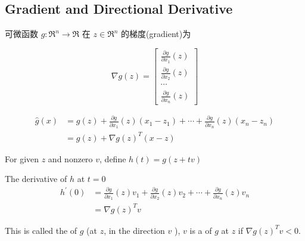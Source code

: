 \subsection{Gradient and Directional Derivative}

\begin{definition}
    可微函数 $ g: \mathfrak{R}^{n} \rightarrow \mathfrak{R} $ 在 $ z \in \mathfrak{R}^{n} $ 的梯度(gradient)为

\begin{equation}
\nabla g(z)=\left[\begin{array}{c}
\frac{\partial g}{\partial x_{1}}(z) \\
\frac{\partial g}{\partial x_{2}}(z) \\
\cdots \\
\frac{\partial g}{\partial x_{n}}(z)
\end{array}\right]
\end{equation}
\end{definition}

\begin{definition}
    \begin{equation} \begin{aligned} \hat{g}(x) &=g(z)+\frac{\partial g}{\partial x_{1}}(z)\left(x_{1}-z_{1}\right)+\cdots+\frac{\partial g}{\partial x_{n}}(z)\left(x_{n}-z_{n}\right) \\ &=g(z)+\nabla g(z)^{T}(x-z) \end{aligned} \end{equation}
\end{definition}

\begin{definition}
    For given $ z $ and nonzero $ v $, define $ h(t)=g(z+t v) $

   The derivative of $ h $ at $ t=0 $
\begin{equation}
\begin{aligned}
h^{\prime}(0) &=\frac{\partial g}{\partial x_{1}}(z) v_{1}+\frac{\partial g}{\partial x_{2}}(z) v_{2}+\cdots+\frac{\partial g}{\partial x_{n}}(z) v_{n} \\
&=\nabla g(z)^{T} v
\end{aligned}
\end{equation}

This is called the  of $ g $ (at $ z $, in the direction $ v $ ), $ v $ is a  of $ g $ at $ z $ if $ \nabla g(z)^{T} v<0 $.
\end{definition}

